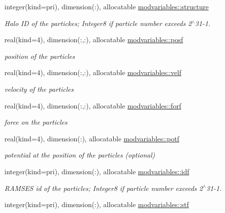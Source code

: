 \begin{DoxyCompactItemize}
integer(kind=pri), dimension(\+:), allocatable \hyperlink{namespacemodvariables_a93c25eb46b5370bd8153733e03f3008d}{modvariables\+::structure}
\begin{DoxyCompactList}\small\item\em Halo ID of the partickes; Integer8 if particle number exceeds 2$^\wedge$31-\/1. \end{DoxyCompactList}\item 
real(kind=4), dimension(\+:,\+:), allocatable \hyperlink{namespacemodvariables_a7528c234a190760e036921b956ec9fe8}{modvariables\+::posf}
\begin{DoxyCompactList}\small\item\em position of the particles \end{DoxyCompactList}\item 
real(kind=4), dimension(\+:,\+:), allocatable \hyperlink{namespacemodvariables_a99c2bd91d22daa7bfaa3491624db7f14}{modvariables\+::velf}
\begin{DoxyCompactList}\small\item\em velocity of the particles \end{DoxyCompactList}\item 
real(kind=4), dimension(\+:,\+:), allocatable \hyperlink{namespacemodvariables_a1f2453280a3af1c380a1c3ad4797dc4b}{modvariables\+::forf}
\begin{DoxyCompactList}\small\item\em force on the particles \end{DoxyCompactList}\item 
real(kind=4), dimension(\+:), allocatable \hyperlink{namespacemodvariables_a719beead34fb4c6c7c70e7f51f1dfc78}{modvariables\+::potf}
\begin{DoxyCompactList}\small\item\em potential at the position of the particles (optional) \end{DoxyCompactList}\item 
integer(kind=pri), dimension(\+:), allocatable \hyperlink{namespacemodvariables_a74cd7fb485e34ae685664db5b2629aa9}{modvariables\+::idf}
\begin{DoxyCompactList}\small\item\em R\+A\+M\+S\+ES id of the particles; Integer8 if particle number exceeds 2$^\wedge$31-\/1. \end{DoxyCompactList}\item 
integer(kind=pri), dimension(\+:), allocatable \hyperlink{namespacemodvariables_a5b99e0cc82073c06969e0fe6caa06357}{modvariables\+::stf}

\end{DoxyCompactItemize}
